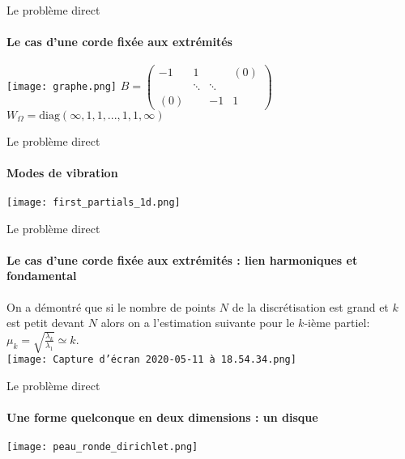 \documentclass{beamer}
\begin{document}
\begin{frame}{Le problème direct}
  \framesubtitle{Le cas d'une corde fixée aux extrémités}

\texttt{[image: graphe.png]}  
$
B = \begin{pmatrix}
    -1 & 1 &  & (0) \\ 
    & \ddots & \ddots  \\ 
    (0) & & -1 & 1
\end{pmatrix}
$\\

$W_\Omega = \mbox{diag}(\infty,1,1,...,1,1,\infty)$\\

\end{frame}

\begin{frame}{Le problème direct}
  \framesubtitle{Modes de vibration}

\texttt{[image: first\_partials\_1d.png]}  

\end{frame}

\begin{frame}{Le problème direct}
  \framesubtitle{Le cas d'une corde fixée aux extrémités : lien harmoniques et fondamental}
  
  On a démontré que si le nombre de points $N$ de la discrétisation est grand et $k$ est petit devant $N$ alors on a l'estimation suivante pour le $k$-ième partiel: $\mu_k=\sqrt{\frac{\lambda_k}{\lambda_1}}\simeq k$. \\
  
\texttt{[image: Capture d’écran 2020-05-11 à 18.54.34.png]}  
  
\end{frame}

\begin{frame}{Le problème direct}
  \framesubtitle{Une forme quelconque en deux dimensions : un disque}
  
 \begin{center}
     \texttt{[image: peau\_ronde\_dirichlet.png]}
 \end{center}

  
\end{frame}
\end{document}
